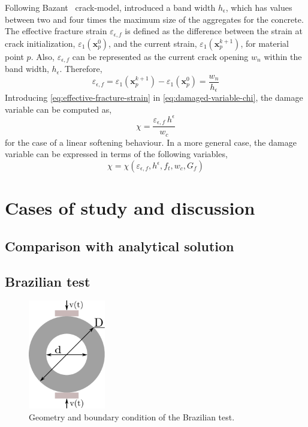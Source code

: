 \message{ !name(2020_EFM_MPM_Eigensoftening.tex)}\documentclass[preprint,12pt,a4paper]{elsarticle}
\newcommand{\vec}[1]{
  \ensuremath{\mathbf{{#1}}}
}
\begin{document}
Following Bazant~\cite{Bazant83} crack-model, \cite{Navas_2017_ES}
introduced a band width $h_{\epsilon}$, which has values between two
and four times the maximum size of the aggregates for the
concrete. The effective fracture strain $\varepsilon_{\epsilon,f}$ is
defined as the difference between the strain at crack initialization,
$\varepsilon_1(\vec{x}_p^{0})$, and the current strain, $\varepsilon_1(\vec{x}_p^{k+1})$, for material
point $p$. Also, $\varepsilon_{\epsilon,f}$ can be represented as the
current crack opening $w_n$ within the band width,
$h_{\epsilon}$. Therefore,
\begin{equation}
  \label{eq:effective-fracture-strain}
  \varepsilon_{\epsilon,f} = \varepsilon_1(\vec{x}_p^{k+1}) -
  \varepsilon_1(\vec{x}_p^{0}) = \frac{w_n}{h_{\epsilon}}
\end{equation}
Introducing \eqref{eq:effective-fracture-strain} in
\eqref{eq:damaged-variable-chi}, the damage variable can be computed
as,
\begin{equation}
  \label{eq:damage-variable-chi-II}
\chi = \frac{\varepsilon_{\epsilon,f}\ h^{\epsilon}}{w_c}  
\end{equation}
for the case of a linear softening behaviour. In a more general case,
the damage variable can be expressed in terms of the following
variables,
\begin{equation}
  \label{eq:damage-variable-chi-III}
  \chi = \chi(\varepsilon_{\epsilon,f}, h^{\epsilon}, f_t, w_c, G_f)
\end{equation}
\section{Cases of study and discussion}
\label{sec:3}

\subsection{Comparison with analytical solution}
\label{sec:3.1}

\subsection{Brazilian test}
\label{sec:3.2}

\begin{figure}
  \centering
  \includegraphics[width=0.3\textwidth]{Figures/Brazilian}
  \caption{Geometry and boundary condition of the Brazilian test.}
  \label{fig:geometry-brazilian-test}
\end{figure}
\end{document}

